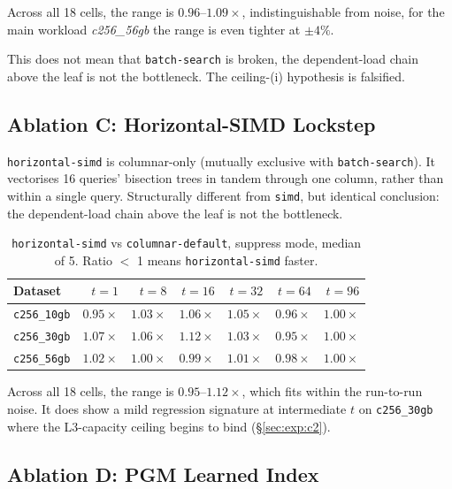 Across all 18 cells, the range is $0.96$--$1.09\times$, indistinguishable from noise, for the main workload \emph{c256\_56gb} the range is even tighter at $\pm 4\%$. 

This does not mean that \texttt{batch-search} is broken, the dependent-load chain above the leaf is not the bottleneck. The ceiling-(i) hypothesis is falsified.

\subsection{Ablation C: Horizontal-SIMD Lockstep\label{sec:exp:c1:horizontal}}

\texttt{horizontal-simd} \cite{polychroniou_2014} is columnar-only (mutually exclusive with \texttt{batch-search}). It vectorises 16 queries' bisection trees in tandem through one column, rather than within a single query. Structurally different from \texttt{simd}, but identical conclusion: the dependent-load chain above the leaf is not the bottleneck.

\begin{table}[H]
  \centering
  \caption[\texttt{horizontal-simd} vs.\ columnar default.]{\texttt{horizontal-simd} vs \texttt{columnar-default}, suppress mode, median of 5. Ratio $<$ 1 means \texttt{horizontal-simd} faster.}
  \label{tab:horizsimd}
  \begin{tabular}{lrrrrrr}
    \toprule
    Dataset & $t{=}1$ & $t{=}8$ & $t{=}16$ & $t{=}32$ & $t{=}64$ & $t{=}96$ \\
    \midrule
    \texttt{c256\_10gb} & $0.95\times$ & $1.03\times$ & $1.06\times$ & $1.05\times$ & $0.96\times$ & $1.00\times$ \\
    \texttt{c256\_30gb} & $1.07\times$ & $1.06\times$ & $1.12\times$ & $1.03\times$ & $0.95\times$ & $1.00\times$ \\
    \texttt{c256\_56gb} & $1.02\times$ & $1.00\times$ & $0.99\times$ & $1.01\times$ & $0.98\times$ & $1.00\times$ \\
    \bottomrule
  \end{tabular}
\end{table}

Across all 18 cells, the range is $0.95$--$1.12\times$, which fits within the run-to-run noise. It does show a mild regression signature at intermediate $t$ on \texttt{c256\_30gb} where the L3-capacity ceiling begins to bind (§\ref{sec:exp:c2}). 

\subsection{Ablation D: PGM Learned Index\label{sec:exp:c1:pgm}}

